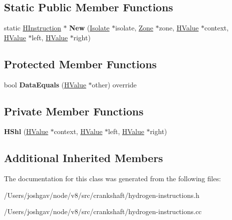 \subsection*{Static Public Member Functions}
\begin{DoxyCompactItemize}
\item 
static \hyperlink{classv8_1_1internal_1_1_h_instruction}{H\+Instruction} $\ast$ {\bfseries New} (\hyperlink{classv8_1_1internal_1_1_isolate}{Isolate} $\ast$isolate, \hyperlink{classv8_1_1internal_1_1_zone}{Zone} $\ast$zone, \hyperlink{classv8_1_1internal_1_1_h_value}{H\+Value} $\ast$context, \hyperlink{classv8_1_1internal_1_1_h_value}{H\+Value} $\ast$left, \hyperlink{classv8_1_1internal_1_1_h_value}{H\+Value} $\ast$right)\hypertarget{classv8_1_1internal_1_1_h_shl_aab761af1220b88a17c8c1cdfb093451e}{}\label{classv8_1_1internal_1_1_h_shl_aab761af1220b88a17c8c1cdfb093451e}

\end{DoxyCompactItemize}
\subsection*{Protected Member Functions}
\begin{DoxyCompactItemize}
\item 
bool {\bfseries Data\+Equals} (\hyperlink{classv8_1_1internal_1_1_h_value}{H\+Value} $\ast$other) override\hypertarget{classv8_1_1internal_1_1_h_shl_af9a918fa47a988d5835020b866186b64}{}\label{classv8_1_1internal_1_1_h_shl_af9a918fa47a988d5835020b866186b64}

\end{DoxyCompactItemize}
\subsection*{Private Member Functions}
\begin{DoxyCompactItemize}
\item 
{\bfseries H\+Shl} (\hyperlink{classv8_1_1internal_1_1_h_value}{H\+Value} $\ast$context, \hyperlink{classv8_1_1internal_1_1_h_value}{H\+Value} $\ast$left, \hyperlink{classv8_1_1internal_1_1_h_value}{H\+Value} $\ast$right)\hypertarget{classv8_1_1internal_1_1_h_shl_a66bd7b899b93119283d4238c446789a5}{}\label{classv8_1_1internal_1_1_h_shl_a66bd7b899b93119283d4238c446789a5}

\end{DoxyCompactItemize}
\subsection*{Additional Inherited Members}


The documentation for this class was generated from the following files\+:\begin{DoxyCompactItemize}
\item 
/\+Users/joshgav/node/v8/src/crankshaft/hydrogen-\/instructions.\+h\item 
/\+Users/joshgav/node/v8/src/crankshaft/hydrogen-\/instructions.\+cc\end{DoxyCompactItemize}
